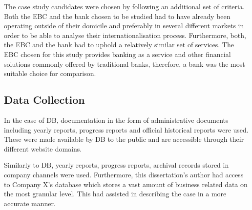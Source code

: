\documentclass[11pt,a4paper]{article}
\begin{document}
{{The case study candidates were chosen by following an additional set of criteria. Both the EBC and the bank chosen to be studied had to have already been operating outside of their domicile and preferably in several different markets in order to be able to analyse their internationalisation process.  Furthermore, both, the EBC and the bank had to uphold a relatively similar set of services. The EBC chosen for this study provides banking as a service and other financial solutions commonly offered by traditional banks, therefore, a bank was the most suitable choice for comparison. 

\vspace{-2mm}

\subsection{Data Collection}
\vspace{-1mm}
 \par
In the case of DB, documentation in the form of administrative documents including yearly reports, progress reports and official historical reports were used. These were made available by DB to the public and are accessible through their different website domains. \par
Similarly to DB, yearly reports, progress reports, archival records stored in company channels were used. Furthermore, this dissertation's author had access to Company X's database which stores a vast amount of business related data on the most granular level. This had assisted in describing the case in a more accurate manner.
\vspace{-3mm}
}}
\end{document}
